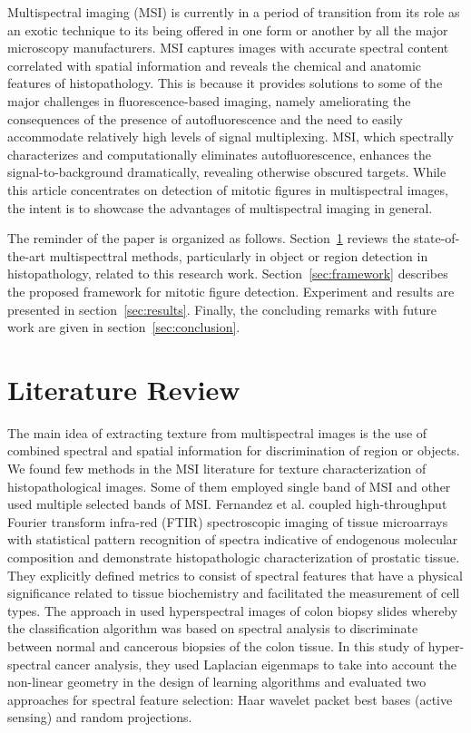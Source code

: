 \documentclass[10pt,twocolumn,letterpaper]{article}
\begin{document}
Multispectral imaging (MSI) is currently in a period of transition from its role as an exotic technique to its being offered in one form or another by all the major microscopy manufacturers. MSI captures images with accurate spectral content correlated with spatial information and reveals the chemical and anatomic features of histopathology. This is because it provides solutions to some of the major challenges in fluorescence-based imaging, namely ameliorating the consequences of the presence of autofluorescence and the need to easily accommodate relatively high levels of signal multiplexing. MSI, which spectrally characterizes and computationally eliminates autofluorescence, enhances the signal-to-background dramatically, revealing otherwise obscured targets. While this article concentrates on detection of mitotic figures in multispectral images, the intent is to showcase the advantages of multispectral imaging in general. 

The reminder of the paper is organized as follows. Section~\ref{sec:previous} reviews the state-of-the-art multispecttral methods, particularly in object or region detection in histopathology, related to this research work. Section~\ref{sec:framework} describes the proposed framework for mitotic figure detection. Experiment and results are presented in section~\ref{sec:results}. Finally, the concluding remarks with future work are given in section~\ref{sec:conclusion}.

\section{Literature Review}
\label{sec:previous}
The main idea of extracting texture from multispectral images is the use of combined spectral and spatial information for discrimination of region or objects. We found few methods in the MSI literature for texture characterization of histopathological images. Some of them employed single band of MSI and other used multiple selected bands of MSI. Fernandez et al. \cite{fernandez2005} coupled high-throughput Fourier transform infra-red (FTIR) spectroscopic imaging of tissue microarrays with statistical pattern recognition of spectra indicative of endogenous molecular composition and demonstrate histopathologic characterization of prostatic tissue. They explicitly defined metrics to consist of spectral features that have a physical significance related to tissue biochemistry and facilitated the measurement of cell types. The approach in \cite{woolfe2006} used hyperspectral images of colon biopsy slides whereby the classification algorithm was based on spectral analysis to discriminate between normal and cancerous biopsies of the colon tissue. In this study of hyper-spectral cancer analysis, they used Laplacian eigenmaps to take into account the non-linear geometry in the design of learning algorithms and evaluated two approaches for spectral feature selection: Haar wavelet packet best bases (active sensing) and random projections.
\end{document}
